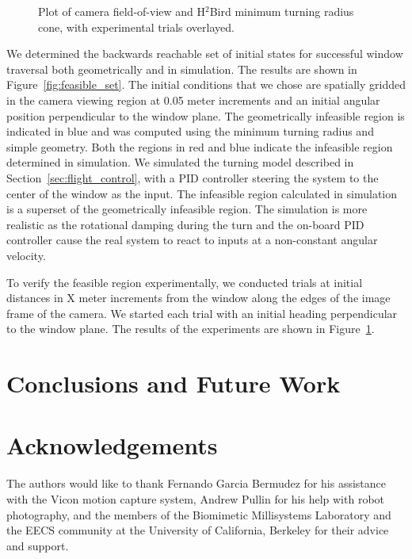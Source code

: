 \documentclass{aamas2013}
\begin{document}
\begin{figure}[tb]
\begin{minipage}[b]{0.45\linewidth}
\caption{Plot of camera field-of-view and H$^2$Bird minimum turning radius 
cone, with experimental trials overlayed.}
\label{fig:flight_paths}
\end{minipage}
\end{figure}


We determined the backwards reachable set of initial states for successful
window traversal both geometrically and in simulation. The results are shown
in Figure~\ref{fig:feasible_set}. The initial conditions that we chose are
spatially gridded in the camera viewing region at 0.05 meter increments and an
initial angular position perpendicular to the window plane. The geometrically
infeasible region is indicated in blue and was computed using the minimum
turning radius and simple geometry. Both the regions in red and blue indicate
the infeasible region determined in simulation. We simulated the turning model
described in Section~\ref{sec:flight_control}, with a PID controller steering
the system to the center of the window as the input. The infeasible region
calculated in simulation is a superset of the geometrically infeasible region.
The simulation is more realistic as the rotational damping during the turn and
the on-board PID controller cause the real system to react to inputs at a
non-constant angular velocity.

To verify the feasible region experimentally, we conducted trials at initial
distances in X meter increments from the window along the edges of the image
frame of the camera. We started each trial with an initial heading
perpendicular to the window plane. The results of the experiments are shown in
Figure~\ref{fig:flight_paths}.

\section{Conclusions and Future Work}

\section{Acknowledgements}
The authors would like to thank Fernando Garcia Bermudez for his 
assistance with the Vicon motion capture system, Andrew Pullin for his 
help with robot photography, and the members of the Biomimetic 
Millisystems Laboratory and the EECS community at the University of 
California, Berkeley for their advice and support.
\end{document}
